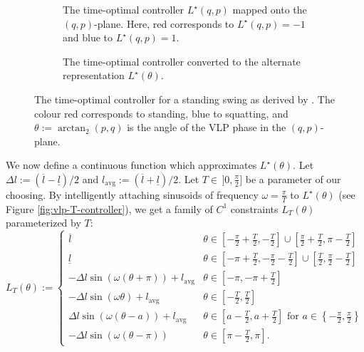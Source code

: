 \begin{figure}
   \centering
   \begin{subfigure}[t]{0.45\textwidth}
      
      \caption{The time-optimal controller \(L^\star(q,p)\) mapped onto the
      \((q,p)\)-plane. Here, red corresponds to \(L^\star(q,p) = -1\) and blue
      to \(L^\star(q,p) = 1\).}
      \label{fig:vlp-optimal-controller-qp-plane}
   \end{subfigure}
   \hfill
   \begin{subfigure}[t]{0.45\textwidth}
      
      \caption{The time-optimal controller converted to the alternate
      representation \(L^\star(\theta)\).}
      \label{fig:vlp-optimal-controller}
   \end{subfigure}
   \caption{The time-optimal controller for a standing swing as derived by
      \cite{pumping_swing_standing_squatting}. The colour red
      corresponds to standing, blue to squatting, and 
      \(\theta := \arctan_2(p,q)\) is the angle of the VLP phase in the
      \((q,p)\)-plane.}
\end{figure}

We now define a continuous function which
approximates \(L^\star(\theta)\). 
Let \(\Delta l := (\overline{l} - \underline{l})/2\) and 
\(l_{\text{avg}} := (\overline{l} + \underline{l})/2\).
Let \(T \in \, ]0,\frac{\pi}{2}]\) be a parameter of our choosing.
By intelligently attaching sinusoids of frequency \(\omega = \frac{\pi}{T}\) to
\(L^\star(\theta)\) (see Figure \ref{fig:vlp-T-controller}), we get a family of
\(C^1\) constraints \(L_T(\theta)\) parameterized
by \(T\): 
\begin{equation}\label{eqn:vlp-T-controller}
   L_T(\theta) := \begin{cases}
      \overline{l} & \theta \in \left[-\frac{\pi}{2} + \frac{T}{2}, -\frac{T}{2}\right] 
      \cup \left[\frac{\pi}{2} + \frac{T}{2}, \pi - \frac{T}{2}\right] \\
      \underline{l} & \theta \in \left[-\pi + \frac{T}{2}, -\frac{\pi}{2} - \frac{T}{2}\right] 
      \cup \left[\frac{T}{2}, \frac{\pi}{2} - \frac{T}{2}\right] \\
      -\Delta l \sin(\omega(\theta + \pi)) + l_{\text{avg}} & \theta \in
      \left[-\pi,-\pi + \frac{T}{2}\right] \\
      -\Delta l \sin(\omega \theta) + l_\text{avg} & \theta \in [-\frac{T}{2},
      \frac{T}{2}] \\
      \Delta l \sin(\omega(\theta - a)) + l_\text{avg} & 
      \theta \in \left[a - \frac{T}{2}, a + \frac{T}{2}\right] \text{ for } 
      a \in \left\{-\frac{\pi}{2}, \frac{\pi}{2}\right\} \\
      -\Delta l \sin(\omega(\theta-\pi)) & \theta \in \left[\pi - \frac{T}{2},\pi\right] 
      .
   \end{cases}
\end{equation}

